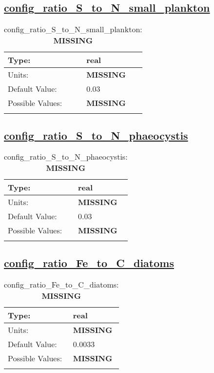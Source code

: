 \subsection[config\_ratio\_S\_to\_N\_small\_plankton]{\hyperref[sec:nm_tab_biogeochemistry]{config\_ratio\_S\_to\_N\_small\_plankton}}
\label{subsec:nm_sec_config_ratio_S_to_N_small_plankton}
\begin{center}
\begin{longtable}{| p{2.0in} || p{4.0in} |}
    \hline
    Type: & real \\
    \hline
    Units: & {\bf \color{red} MISSING} \\
    \hline
    Default Value: & 0.03 \\
    \hline
    Possible Values: & {\bf \color{red} MISSING} \\
    \hline
    \caption{config\_ratio\_S\_to\_N\_small\_plankton: {\bf \color{red} MISSING}}
\end{longtable}
\end{center}
\subsection[config\_ratio\_S\_to\_N\_phaeocystis]{\hyperref[sec:nm_tab_biogeochemistry]{config\_ratio\_S\_to\_N\_phaeocystis}}
\label{subsec:nm_sec_config_ratio_S_to_N_phaeocystis}
\begin{center}
\begin{longtable}{| p{2.0in} || p{4.0in} |}
    \hline
    Type: & real \\
    \hline
    Units: & {\bf \color{red} MISSING} \\
    \hline
    Default Value: & 0.03 \\
    \hline
    Possible Values: & {\bf \color{red} MISSING} \\
    \hline
    \caption{config\_ratio\_S\_to\_N\_phaeocystis: {\bf \color{red} MISSING}}
\end{longtable}
\end{center}
\subsection[config\_ratio\_Fe\_to\_C\_diatoms]{\hyperref[sec:nm_tab_biogeochemistry]{config\_ratio\_Fe\_to\_C\_diatoms}}
\label{subsec:nm_sec_config_ratio_Fe_to_C_diatoms}
\begin{center}
\begin{longtable}{| p{2.0in} || p{4.0in} |}
    \hline
    Type: & real \\
    \hline
    Units: & {\bf \color{red} MISSING} \\
    \hline
    Default Value: & 0.0033 \\
    \hline
    Possible Values: & {\bf \color{red} MISSING} \\
    \hline
    \caption{config\_ratio\_Fe\_to\_C\_diatoms: {\bf \color{red} MISSING}}
\end{longtable}
\end{center}
